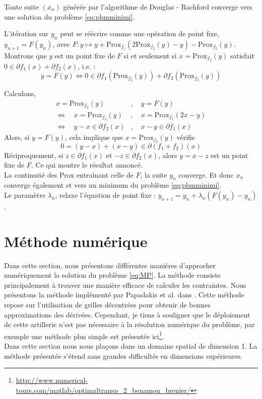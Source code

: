 \documentclass[a4paper,12pt]{article}
\newcommand{\prox}{\text{Prox}}
\begin{document}
\begin{propriete}
Toute suite $(x_n)$ générée par l'algorithme de Douglas - Rachford converge vers une solution du problème \ref{eq:pbmminimi}.
\end{propriete}

\begin{preuve}
L'itération sur $y_n$ peut se réécrire comme une opération de point fixe, $y_{n+1}=F(y_n)$, avec $F:y\mapsto y+\prox_{ f_1}(2\prox_{f_2}(y)-y)-\prox_{f_2}(y)$.\\
Montrons que $y$ est un point fixe de $F$ si et seulement si $x=\prox_{f_2}(y)$ satisfait $0\in\partial f_1(x)+\partial f_2(x)$, i.e. :
$$
y=F(y) \Longleftrightarrow 0\in\partial f_1(\prox_{f_2}(y))+\partial f_2(\prox_{f_2}(y))
$$ 

Calculons, 
\begin{align*}
x=\prox_{f_2}(y) &,\quad y = F(y) \\
\Longleftrightarrow\quad x=\prox_{ f_2}(y) &,\quad x = \prox_{f_1}(2x-y) \\
\Longleftrightarrow\quad y-x\in\partial f_2(x)   &, \quad x-y\in\partial f_1(x)
\end{align*}
Alors, si $y=F(y)$, cela implique que $x=\prox_{f_2}(y)$ vérifie 
$$
0=(y-x)+(x-y)\in \partial(f_1+f_2)(x)
$$
Réciproquement, si $z\in\partial f_1(x)$ et $-z\in\partial f_2(x)$, alors $y=x-z$ est un point fixe de $F$. Ce qui montre le résultat annoncé.\\
La continuité des $\prox$ entraînant celle de $F$, la suite $y_n$ converge. Et donc $x_n$ converge également et vers un minimum du problème \eqref{eq:pbmminimi}.\\

Le paramètre $\lambda_n$, relaxe l'équation de point fixe : $y_{n+1}=y_n + \lambda_n(F(y_n)-y_n)$. 
\end{preuve}






\newpage

\section{Méthode numérique}
\label{sec:numerique}
Dans cette section, nous présentons différentes manières d'approcher numériquement la solution du problème \eqref{eq:MP}. La méthode consiste principalement à trouver une manière efficace de calculer les contraintes. Nous présentons la méthode implémenté par Papadakis et al. dans \cite{papadakis}. Cette méthode repose sur l'utilisation de grilles décentrées pour obtenir de bonnes approximations des dérivées. Cependant, je tiens à souligner que le déploiement de cette artillerie n'est pas nécessaire à la résolution numérique du problème, par exemple une méthode plus simple est présentée ici\footnote{\url{http://www.numerical-tours.com/matlab/optimaltransp\_2\_benamou\_brenier/}}.\\
Dans cette section nous nous plaçons dans un domaine spatial de dimension 1. La méthode présentée s'étend sans grandes difficultés en dimensions supérieures. 
\end{document}
